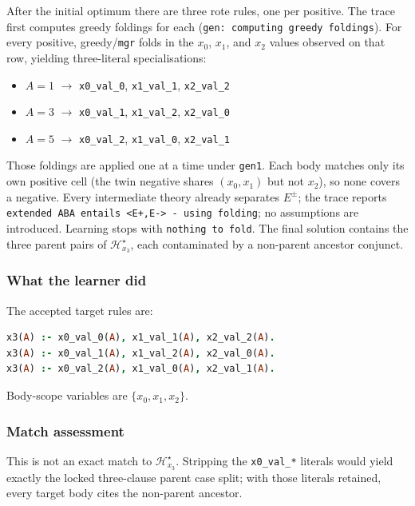 \documentclass[11pt]{article}
\begin{document}
After the initial optimum there are three rote rules, one per positive. The trace first computes greedy foldings for each (\texttt{gen: computing greedy foldings}). For every positive, greedy/\texttt{mgr} folds in the \(x_0\), \(x_1\), and \(x_2\) values observed on that row, yielding three-literal specialisations:

\begin{itemize}
  \item \(A=1\) \(\rightarrow\) \texttt{x0\_val\_0}, \texttt{x1\_val\_1}, \texttt{x2\_val\_2}
  \item \(A=3\) \(\rightarrow\) \texttt{x0\_val\_1}, \texttt{x1\_val\_2}, \texttt{x2\_val\_0}
  \item \(A=5\) \(\rightarrow\) \texttt{x0\_val\_2}, \texttt{x1\_val\_0}, \texttt{x2\_val\_1}
\end{itemize}

Those foldings are applied one at a time under \texttt{gen1}. Each body matches only its own positive cell (the twin negative shares \((x_0,x_1)\) but not \(x_2\)), so none covers a negative. Every intermediate theory already separates \(E^\pm\); the trace reports \texttt{extended ABA entails <E+,E-> - using folding}; no assumptions are introduced. Learning stops with \texttt{nothing to fold}. The final solution contains the three parent pairs of \(\mathcal{H}_{x_3}^\star\), each contaminated by a non-parent ancestor conjunct.

\subsubsection{What the learner did}

The accepted target rules are:

\begin{lstlisting}[style=logic,language=Prolog]
x3(A) :- x0_val_0(A), x1_val_1(A), x2_val_2(A).
x3(A) :- x0_val_1(A), x1_val_2(A), x2_val_0(A).
x3(A) :- x0_val_2(A), x1_val_0(A), x2_val_1(A).
\end{lstlisting}

Body-scope variables are \(\{x_0,x_1,x_2\}\).

\subsubsection{Match assessment}

This is not an exact match to \(\mathcal{H}_{x_3}^\star\). Stripping the \texttt{x0\_val\_*} literals would yield exactly the locked three-clause parent case split; with those literals retained, every target body cites the non-parent ancestor.
\end{document}
